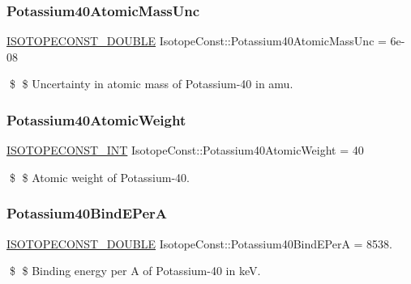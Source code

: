 \subsubsection{\texorpdfstring{Potassium40\+Atomic\+Mass\+Unc}{Potassium40AtomicMassUnc}}
{\footnotesize\ttfamily \mbox{\hyperlink{group___isotope_const-_macros_ga8f45a7272ce02c0b4c65c44636ed719a}{I\+S\+O\+T\+O\+P\+E\+C\+O\+N\+S\+T\+\_\+\+D\+O\+U\+B\+LE}} Isotope\+Const\+::\+Potassium40\+Atomic\+Mass\+Unc = 6e-\/08}

\$ \$ Uncertainty in atomic mass of Potassium-\/40 in amu. \mbox{\label{group___isotope_const-_potassium-_k40_ga5e3cc26878a0d8abccc506398d74a8e0}} 
\subsubsection{\texorpdfstring{Potassium40\+Atomic\+Weight}{Potassium40AtomicWeight}}
{\footnotesize\ttfamily \mbox{\hyperlink{group___isotope_const-_macros_ga5f18360b3e99483a35c32d789e62621c}{I\+S\+O\+T\+O\+P\+E\+C\+O\+N\+S\+T\+\_\+\+I\+NT}} Isotope\+Const\+::\+Potassium40\+Atomic\+Weight = 40}

\$ \$ Atomic weight of Potassium-\/40. \mbox{\label{group___isotope_const-_potassium-_k40_ga8b2b32f503208718826da440f64435ce}} 
\subsubsection{\texorpdfstring{Potassium40\+Bind\+E\+PerA}{Potassium40BindEPerA}}
{\footnotesize\ttfamily \mbox{\hyperlink{group___isotope_const-_macros_ga8f45a7272ce02c0b4c65c44636ed719a}{I\+S\+O\+T\+O\+P\+E\+C\+O\+N\+S\+T\+\_\+\+D\+O\+U\+B\+LE}} Isotope\+Const\+::\+Potassium40\+Bind\+E\+PerA = 8538.}

\$ \$ Binding energy per A of Potassium-\/40 in keV. \mbox{\label{group___isotope_const-_potassium-_k40_ga6eb068669ccd1feae21c766d24dfb52c}} 
